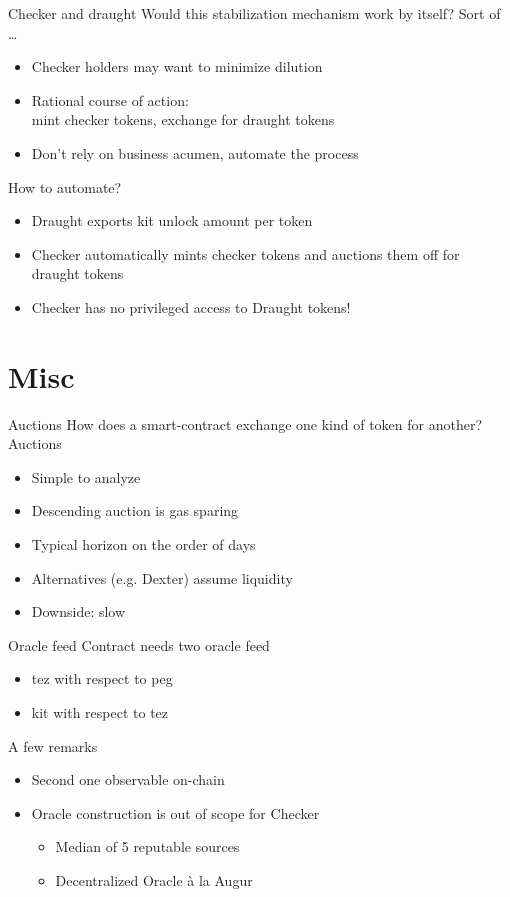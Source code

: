 \documentclass[handout]{beamer}
\newcommand{\yel}[
  1]{{\color{yellow} #1}}
\begin{document}
\begin{frame}{Checker and draught}
  Would this stabilization mechanism work by itself? Sort of \ldots
  \begin{itemize}
    \item Checker holders may want to minimize dilution
    \item Rational course of action:\\
      mint checker tokens, exchange for draught tokens
    \item Don't rely on business acumen, automate the process
  \end{itemize}
  How to automate?
  \begin{itemize}
  \item Draught exports \yel{kit unlock amount} per token
  \item Checker automatically mints checker tokens and auctions them off for draught tokens
  \item Checker has no privileged access to Draught \yel{tokens}!
  \end{itemize}
\end{frame}

\section{Misc}

\begin{frame}{Auctions}
  How does a smart-contract exchange one kind of token for another? Auctions
  \begin{itemize}
  \item \yel{Simple} to analyze
  \item Descending auction is \yel{gas sparing}
  \item Typical horizon on the order of days
  \item Alternatives (e.g. Dexter) assume liquidity
  \item Downside: slow
  \end{itemize}
\end{frame}

\begin{frame}{Oracle feed}
  Contract needs two oracle feed
  \begin{itemize}
  \item \yel{tez} with respect to peg
  \item \yel{kit} with respect to tez
  \end{itemize}
  A few remarks
  \begin{itemize}
  \item Second one observable on-chain
  \item Oracle construction is out of scope for Checker
    \begin{itemize}
    \item Median of 5 reputable sources
    \item Decentralized Oracle à la Augur
    \end{itemize}
  \end{itemize}
\end{frame}
\end{document}
